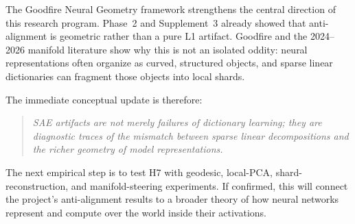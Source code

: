 \documentclass[11pt,a4paper]{article}
\begin{document}
The Goodfire Neural Geometry framework strengthens the central direction of this research program. Phase~2 and Supplement~3 already showed that anti-alignment is geometric rather than a pure L1 artifact. Goodfire and the 2024--2026 manifold literature show why this is not an isolated oddity: neural representations often organize as curved, structured objects, and sparse linear dictionaries can fragment those objects into local shards.

The immediate conceptual update is therefore:
\begin{quote}
\emph{SAE artifacts are not merely failures of dictionary learning; they are diagnostic traces of the mismatch between sparse linear decompositions and the richer geometry of model representations.}
\end{quote}

The next empirical step is to test H7 with geodesic, local-PCA, shard-reconstruction, and manifold-steering experiments. If confirmed, this will connect the project's anti-alignment results to a broader theory of how neural networks represent and compute over the world inside their activations.

\newpage


\end{document}
